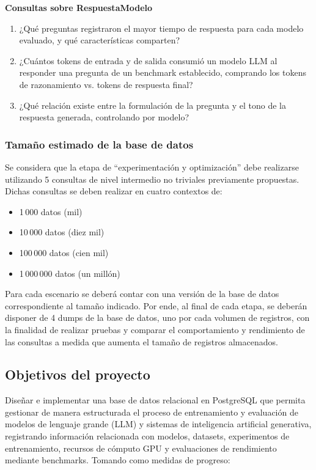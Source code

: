\documentclass[12pt,a4paper]{article}
\begin{document}
\noindent \textbf{Consultas sobre RespuestaModelo}
{\begin{enumerate}
  \item ¿Qué preguntas registraron el mayor tiempo de respuesta para cada modelo evaluado, y qué características comparten?
  \item ¿Cuántos tokens de entrada y de salida consumió un modelo LLM al responder una pregunta de un benchmark establecido, comprando los tokens de razonamiento vs. tokens de respuesta final?
  \item ¿Qué relación existe entre la formulación de la pregunta y el tono de la respuesta generada, controlando por modelo?
\end{enumerate}
}

\subsubsection{Tamaño estimado de la base de datos}

Se considera que la etapa de ``experimentación y optimización'' debe realizarse utilizando 5 consultas de nivel intermedio no triviales previamente propuestas. Dichas consultas se deben realizar en cuatro contextos de:
{\begin{itemize}
  \item 1\,000 datos (mil)
  \item 10\,000 datos (diez mil)
  \item 100\,000 datos (cien mil)
  \item 1\,000\,000 datos (un millón)
\end{itemize}
}

\noindent Para cada escenario se deberá contar con una versión de la base de datos correspondiente al tamaño indicado. Por ende, al final de cada etapa, se deberán disponer de 4 dumps de la base de datos, uno por cada volumen de registros, con la finalidad de realizar pruebas y comparar el comportamiento y rendimiento de las consultas a medida que aumenta el tamaño de registros almacenados.


\subsection{Objetivos del proyecto}

Diseñar e implementar una base de datos relacional en PostgreSQL que permita gestionar de manera estructurada el proceso de entrenamiento y evaluación de modelos de lenguaje grande (LLM) y sistemas de inteligencia artificial generativa, registrando información relacionada con modelos, datasets, experimentos de entrenamiento, recursos de cómputo GPU y evaluaciones de rendimiento mediante benchmarks. Tomando como medidas de progreso:
\end{document}

